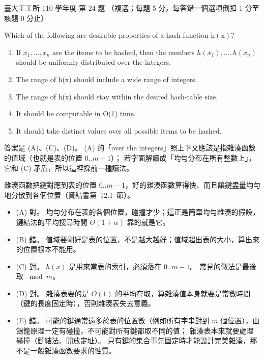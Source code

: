 \begin{pastexam}[label={px:ntu-110-ie-ds-24}]{臺大工工所 110 學年度 第 24 題}
（複選；每題 5 分，每答錯一個選項倒扣 1 分至該題 0 分止）

Which of the following are desirable properties of a hash function $\mathrm{h(x)}$?
\begin{enumerate}[label=(\Alph*)]
\item If $x_1,\ldots,x_n$ are the items to be hashed, then the numbers $h(x_1),\ldots,h(x_n)$ should be
uniformly distributed over the integers.
\item The range of h(x) should include a wide range of integers.
\item The range of h(x) should stay within the desired hash-table size.
\item It should be computable in O(1) time.
\item It should take distinct values over all possible items to be hashed.
\end{enumerate}
\end{pastexam}

\begin{pastsoln}
答案是 (A)、(C)、(D)。 (A) 的「over the integers」照上下文應該是指雜湊函數的值域（也就是表的位置 $0..m-1$）；
若字面解讀成「均勻分布在所有整數上」，它和 (C) 矛盾，所以這裡採前一種讀法。

雜湊函數把鍵對應到表的位置 $0..m-1$，好的雜湊函數算得快、而且讓鍵盡量均勻地分散到各個位置（資結書第~12.1~節）。
\begin{itemize}
\item (A) 對。 均勻分布在表的各個位置，碰撞才少；這正是簡單均勻雜湊的假設，鏈結法的平均搜尋時間 $\Theta(1 + \alpha)$ 靠的就是它。
\item (B) 錯。 值域要剛好是表的位置，不是越大越好；值域超出表的大小，算出來的位置根本不能用。
\item (C) 對。 $h(x)$ 是用來當表的索引，必須落在 $0..m-1$。 常見的做法是最後取 $\bmod m$。
\item (D) 對。 雜湊表要的是 $O(1)$ 的平均存取，算雜湊值本身就要是常數時間（鍵的長度固定時），否則雜湊表失去意義。
\item (E) 錯。 可能的鍵通常遠多於表的位置數（例如所有字串對到 $m$ 個位置），由鴿籠原理一定有碰撞，不可能對所有鍵都取不同的值；
雜湊表本來就要處理碰撞（鏈結法、開放定址）。 只有鍵的集合事先固定時才能設計完美雜湊，那不是一般雜湊函數要求的性質。
\end{itemize}
\end{pastsoln}

